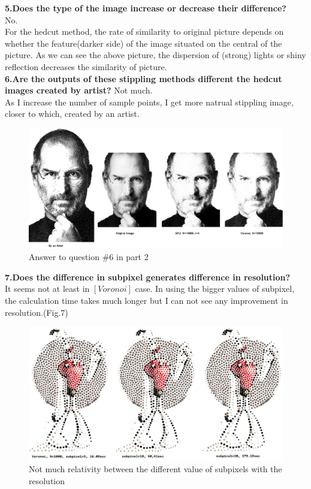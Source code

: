 \documentclass[11pt]{article}
\begin{document}
\bigskip
\textbf{5.Does the type of the image increase or decrease their difference?}\\
No.\\ For the hedcut method, the rate of similarity to original picture depends on whether the feature(darker side) of the image situated on the central of the picture. As we can see the above picture, the dispersion of (strong) lights or shiny reflection decreases the similarity of picture.\\

\textbf{6.Are the outputs of these stippling methods different the hedcut images created by artist?}
Not much.\\
As I increase the number of sample points, I get more natrual stippling image, closer to which, created by an artist.
\begin{figure}[h]
\center
  \includegraphics[width=160mm]{compare(art).jpg}
  \caption{Answer to question \#6 in part 2}\label{compare1h}
\end{figure}

\textbf{7.Does the difference in subpixel generates difference in resolution?}\\
It seems not at least in $[Voronoi]$ case. In using the bigger values of subpixel, the calculation time takes much longer but I can not see any improvement in resolution.(Fig.7)
\begin{figure}[h]
\center
  \includegraphics[width=160mm]{subpixel.jpg}
  \caption{Not much relativity between the different value of subpixels with the resolution}\label{compare1h}
\end{figure}
\end{document}
